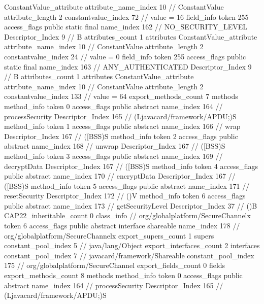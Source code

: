 {{{{{{				ConstantValue_attribute {
					attribute_name_index	10		// ConstantValue
					attribute_length	2
					constantvalue_index	72		// value = 16
				}
				}
			}
			field_info {
				token	255
				access_flags	public static final
				name_index	162		// NO_SECURITY_LEVEL
				Descriptor_Index	9		// B
				attributes_count	1
				attributes {
				ConstantValue_attribute {
					attribute_name_index	10		// ConstantValue
					attribute_length	2
					constantvalue_index	24		// value = 0
				}
				}
			}
			field_info {
				token	255
				access_flags	public static final
				name_index	163		// ANY_AUTHENTICATED
				Descriptor_Index	9		// B
				attributes_count	1
				attributes {
				ConstantValue_attribute {
					attribute_name_index	10		// ConstantValue
					attribute_length	2
					constantvalue_index	133		// value = 64
				}
				}
			}
			}
			export_methods_count	7
			methods {
				method_info {
					token	0
					access_flags	public abstract
					name_index	164		// processSecurity
					Descriptor_Index	165		// (Ljavacard/framework/APDU;)S
				}
				method_info {
					token	1
					access_flags	public abstract
					name_index	166		// wrap
					Descriptor_Index	167		// ([BSS)S
				}
				method_info {
					token	2
					access_flags	public abstract
					name_index	168		// unwrap
					Descriptor_Index	167		// ([BSS)S
				}
				method_info {
					token	3
					access_flags	public abstract
					name_index	169		// decryptData
					Descriptor_Index	167		// ([BSS)S
				}
				method_info {
					token	4
					access_flags	public abstract
					name_index	170		// encryptData
					Descriptor_Index	167		// ([BSS)S
				}
				method_info {
					token	5
					access_flags	public abstract
					name_index	171		// resetSecurity
					Descriptor_Index	172		// ()V
				}
				method_info {
					token	6
					access_flags	public abstract
					name_index	173		// getSecurityLevel
					Descriptor_Index	37		// ()B
				}
			}
			CAP22_inheritable_count	0
		}
		class_info {		// org/globalplatform/SecureChannelx
			token	6
			access_flags	public abstract interface shareable
			name_index	178		// org/globalplatform/SecureChannelx
			export_supers_count	1
			supers {
				constant_pool_index	5		// java/lang/Object
			}
			export_interfaces_count	2
			interfaces {
				constant_pool_index	7		// javacard/framework/Shareable
				constant_pool_index	175		// org/globalplatform/SecureChannel
			}
			export_fields_count	0
			fields {
			}
			export_methods_count	8
			methods {
				method_info {
					token	0
					access_flags	public abstract
					name_index	164		// processSecurity
					Descriptor_Index	165		// (Ljavacard/framework/APDU;)S
}}}}}
